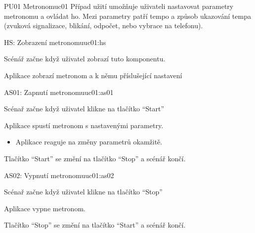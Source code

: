 \begin{usecase}{PU01 Metronom}{uc01}
    Případ užití umožňuje uživateli nastavovat parametry metronomu a ovládat ho. Mezi parametry patří tempo a způsob ukazování tempa (zvuková signalizace, blikání, odpočet, nebo vybrace na telefonu).

    \begin{scenario}{HS: Zobrazení metronomu}{uc01:hs}
        \item Scénář začne když uživatel zobrazí tuto komponentu.
        \item Aplikace zobrazí metronom a k němu příslušející nastavení
    \end{scenario}

    \begin{scenario}{AS01: Zapnutí metronomu}{uc01:as01}
        \item Scénař začne když uživatel klikne na tlačítko \enquote{Start}
        \item Aplikace spustí metronom s nastavenými parametry.
        \begin{itemize}
            \item Aplikace reaguje na změny parametrů okamžitě.
        \end{itemize}
        \item Tlačítko \enquote{Start} se změní na tlačítko \enquote{Stop} a scénář končí.
    \end{scenario}

    \begin{scenario}{AS02: Vypnutí metronomu}{uc01:as02}
        \item Scénař začne když uživatel klikne na tlačítko \enquote{Stop}
        \item Aplikace vypne metronom.
        \item Tlačítko \enquote{Stop} se změní na tlačítko \enquote{Start} a scénář končí.
    \end{scenario}
\end{usecase}